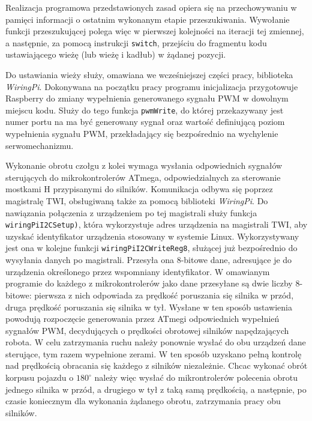 Realizacja programowa przedstawionych zasad opiera się na przechowywaniu w pamięci informacji o ostatnim wykonanym etapie przeszukiwania. Wywołanie funkcji przeszukującej polega więc w pierwszej kolejności na iteracji tej zmiennej, a następnie, za pomocą instrukcji \texttt{switch}, przejściu do fragmentu kodu ustawiającego wieżę (lub wieżę i kadłub) w żądanej pozycji.

Do ustawiania wieży służy, omawiana we wcześniejszej części pracy, biblioteka \textit{WiringPi}. Dokonywana na początku pracy programu inicjalizacja przygotowuje Raspberry do zmiany wypełnienia generowanego sygnału PWM w dowolnym miejscu kodu.  Służy do tego funkcja \texttt{pwmWrite}, do której przekazywany jest numer portu na ma być generowany sygnał oraz wartość definiującą poziom wypełnienia sygnału PWM, przekładający się bezpośrednio na wychylenie serwomechanizmu.

Wykonanie obrotu czołgu z kolei wymaga wysłania odpowiednich sygnałów sterujących do mikrokontrolerów ATmega, odpowiedzialnych za sterowanie mostkami H przypisanymi do silników. Komunikacja odbywa się poprzez magistralę TWI, obsługiwaną także za pomocą biblioteki \textit{WiringPi}. Do nawiązania połączenia z urządzeniem po tej magistrali służy funkcja \texttt{wiringPiI2CSetup)}, która wykorzystuje adres urządzenia na magistrali TWI, aby uzyskać identyfikator urządzenia stosowany w systemie Linux. Wykorzystywany jest ona w kolejne funkcji \texttt{wiringPiI2CWriteReg8}, służącej już bezpośrednio do wysyłania danych po magistrali. Przesyła ona 8-bitowe dane, adresujące je do urządzenia określonego przez wspomniany identyfikator. W omawianym programie do każdego z mikrokontrolerów jako dane przesyłane są dwie liczby 8-bitowe: pierwsza z nich odpowiada za prędkość poruszania się silnika w przód, druga prędkość poruszania się silnika w tył. Wysłane w ten sposób ustawienia powodują rozpoczęcie generowania przez ATmegi odpowiednich wypełnień sygnałów PWM, decydujących o prędkości obrotowej silników napędzających robota. W celu zatrzymania ruchu należy ponownie wysłać do obu urządzeń dane sterujące, tym razem wypełnione zerami. W ten sposób uzyskano pełną kontrolę nad prędkością obracania się każdego z silników niezależnie. Chcac wykonać obrót korpusu pojazdu o $180^\circ$ należy więc wysłać do mikrontrolerów polecenia obrotu jednego silnika w przód, a drugiego w tył z taką samą prędkością, a następnie, po czasie koniecznym dla wykonania żądanego obrotu, zatrzymania pracy obu silników.

